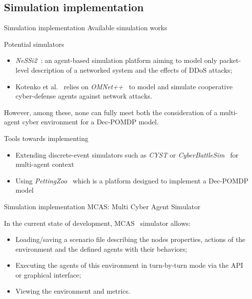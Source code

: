         \subsection{Simulation implementation}
	\begin{frame}{Simulation implementation}
            {Available simulation works}

            \begin{block}{Potential  simulators}
                \begin{itemize}
                    \item \textit{NeSSi2}~\cite{DGrunewald2011}: an agent-based simulation platform aiming to model only packet-level description of a networked system and the effects of DDoS attacks;
                    \item Kotenko et al.~\cite{IKotenko2007} relies on \textit{OMNet++}~\cite{Varga2010} to model and simulate cooperative cyber-defense agents against network attacks.
                \end{itemize}
            \end{block}
            
            However, among these, none can fully meet both the consideration of a multi-agent cyber environment for a Dec-POMDP model.

            \begin{block}{Tools towards implementing}
                \begin{itemize}
                    \item Extending discrete-event simulators such as \textit{CYST}\cite{drasar_session-level_2020} or \textit{CyberBattleSim}~\cite{cyberbattlesim} for multi-agent context
                    \item Using \textit{PettingZoo}~\cite{jk2020} which is a platform designed to implement a Dec-POMDP model
                \end{itemize}
            \end{block}
      
	\end{frame}


        \begin{frame}{Simulation implementation}
            {MCAS: Multi Cyber Agent Simulator}

            In the current state of development, MCAS~\cite{MCASWebsite} simulator allows:

            \begin{itemize}
                \item Loading/saving a scenario file describing the nodes properties, actions of the environment and the defined agents with their behaviors;
                \item Executing the agents of this environment in turn-by-turn mode via the API or graphical interface;
                \item Viewing the environment and metrics.
            \end{itemize}
        \end{frame}

